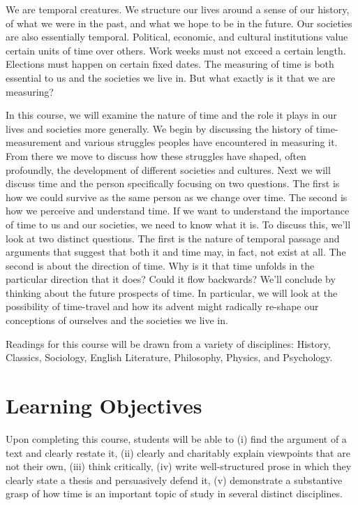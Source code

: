 \documentclass[article,oneside]{memoir}
\begin{document}
We are temporal creatures. We structure our lives around a sense of our history, of what we were in the past, and what we hope to be in the future. Our societies are also essentially temporal. Political, economic, and cultural institutions value certain units of time over others. Work weeks must not exceed a certain length. Elections must happen on certain fixed dates. The measuring of time is both essential to us and the societies we live in. But what exactly is it that we are measuring?

  In this course, we will examine the nature of time and the role it plays in our lives and societies more generally. We begin by discussing the history of time-measurement and various struggles peoples have encountered in measuring it. From there we move to discuss how these struggles have shaped, often profoundly, the development of different societies and cultures. Next we will  discuss  time and the person specifically focusing on two questions. The first is how we could survive as the same person as we change over time. The second is how we perceive and understand time. If we want to understand the importance of time to us and our societies, we need to know what it is. To discuss this, we'll look at two distinct questions. The first is the nature of temporal passage and arguments that suggest that both it and time may, in fact, not exist at all.  The second is about the direction of time. Why is it that time unfolds in the particular direction that it does? Could it flow backwards? We'll conclude by thinking about the future prospects of time. In particular, we will look at the possibility of time-travel and how its advent might radically re-shape our conceptions of ourselves and the societies we live in. 

Readings for this course will be drawn from a variety of disciplines: History, Classics, Sociology, English Literature, Philosophy, Physics, and Psychology.

\section{Learning Objectives}

Upon completing this course, students will be able to (i) find the argument of a text and clearly restate it, (ii) clearly and charitably explain viewpoints that are not their own, (iii) think critically, (iv) write well-structured prose in which they clearly state a thesis and persuasively defend it, (v) demonstrate a substantive grasp of how time is an  important topic of study in several distinct disciplines. 
\end{document}
